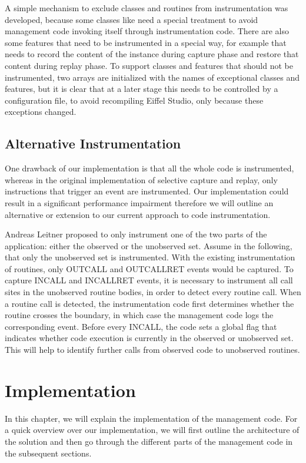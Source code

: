 A simple mechanism to exclude classes and routines from instrumentation was developed, because some classes like  need a special treatment to avoid management code invoking itself through instrumentation code. There are also some features that need to be instrumented in a special way, for example  that needs to record the content of the instance during capture phase and restore that content during replay phase. To support classes and features that should not be instrumented, two arrays are initialized with the names of exceptional classes and features, but it is clear that at a later stage this needs to be controlled by a configuration file, to avoid recompiling Eiffel Studio, only because these exceptions changed.


\subsection{Alternative Instrumentation}
\label{lbl:single-sided_instrumentation}
One drawback of our implementation is that all the whole code is instrumented, whereas in the original implementation of selective capture and replay, only instructions that trigger an event are instrumented. Our implementation could result in a significant performance impairment therefore we will outline an alternative or extension to our current approach to code instrumentation.

Andreas Leitner proposed to only instrument one of the two parts of the application: either the observed or the unobserved set. Assume in the following, that only the unobserved set is instrumented. With the existing instrumentation of routines, only OUTCALL and OUTCALLRET events would be captured. To capture INCALL and INCALLRET events, it is necessary to instrument all call sites in the unobserved routine bodies, in order to detect every routine call. When a routine call is detected, the instrumentation code first determines whether the routine crosses the boundary, in which case the management code logs the corresponding event. Before every INCALL, the code sets a global flag that indicates whether code execution is currently in the observed or unobserved set. This will help to identify further calls from observed code to unobserved routines.


\section{Implementation}
In this chapter, we will explain the implementation of the management code. For a quick overview over our implementation, we will first outline the architecture of the solution and then go through the different parts of the management code in the subsequent sections.


